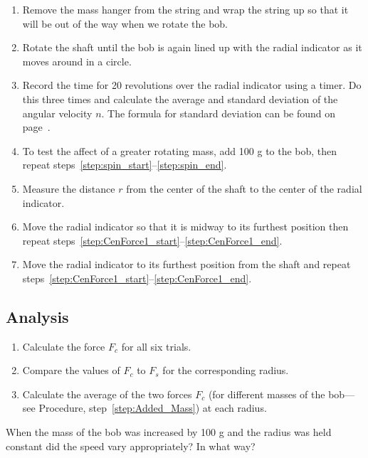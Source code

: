 \documentclass[main.tex]{subfiles}
\begin{document}
\begin{enumerate}
\item
Remove the mass hanger from the string and wrap the string up so that it will be out of the way when we rotate the bob.
\item \label{step:spin_start}
Rotate the shaft until the bob is again lined up with the radial indicator as it moves around in a circle.
\item \label{step:spin_end}
Record the time for 20 revolutions over the radial indicator using a timer. Do this three times and calculate the average and standard deviation of the angular velocity $n.$ The formula for standard deviation can be found on page~\pageref{page:stdDev}.
\item \label{step:Added_Mass}
To test the affect of a greater rotating mass, add 100 g to the bob, then repeat steps~\ref{step:spin_start}--\ref{step:spin_end}.
\item \label{step:CenForce1_end}
Measure the distance $r$ from the center of the shaft to the center of the radial indicator.
\item
Move the radial indicator so that it is midway to its furthest position then repeat steps~\ref{step:CenForce1_start}--\ref{step:CenForce1_end}.
\item
Move the radial indicator to its furthest position from the shaft and repeat steps~\ref{step:CenForce1_start}--\ref{step:CenForce1_end}.
\end{enumerate}

\subsection*{Analysis}
\begin{enumerate}
\item
Calculate the force $F_c$ for all six trials. 
\item
Compare the values of $F_c$ to $F_s$ for the corresponding radius.
\item
Calculate the average of the two forces $F_c$ (for different masses of the bob---see Procedure, step~\ref{step:Added_Mass}) at each radius.
\end{enumerate}

\begin{question}
When the mass of the bob was increased by 100 g and the radius was held constant did the speed vary appropriately? In what way?
\end{question}
\end{document}
